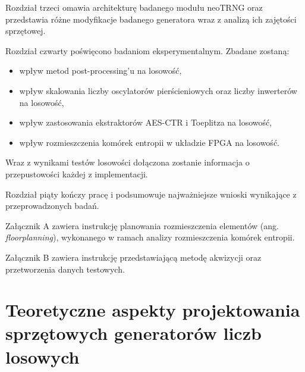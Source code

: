 Rozdział trzeci omawia architekturę badanego modułu neoTRNG oraz przedstawia 
różne modyfikacje badanego generatora wraz z analizą ich zajętości sprzętowej.  

Rozdział czwarty poświęcono badaniom eksperymentalnym. Zbadane zostaną: 
\begin{itemize}
    \item wpływ metod post-processing'u na losowość, 
    \item wpływ skalowania liczby oscylatorów pierścieniowych oraz liczby 
    inwerterów na losowość, 
    \item wpływ zastosowania ekstraktorów AES-CTR i Toeplitza na losowość, 
    \item wpływ rozmieszczenia komórek entropii w układzie FPGA na losowość. 
\end{itemize}

Wraz z wynikami testów losowości dołączona zostanie informacja o przepustowości 
każdej z implementacji.

Rozdział piąty kończy pracę i podsumowuje najważniejsze wnioski wynikające z 
przeprowadzonych badań.

Załącznik A zawiera instrukcję planowania rozmieszczenia elementów 
(ang. \textit{floorplanning}), wykonanego w ramach analizy rozmieszczenia 
komórek entropii.

Załącznik B zawiera instrukcję przedstawiającą metodę akwizycji oraz przetworzenia 
danych testowych.

\chapter{Teoretyczne aspekty projektowania sprzętowych generatorów liczb losowych}



